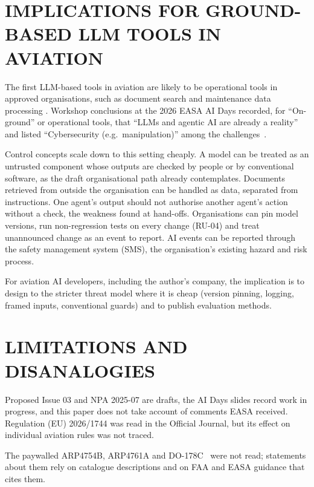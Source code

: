 \documentclass{aer}
\begin{document}
\section{IMPLICATIONS FOR GROUND-BASED LLM TOOLS IN AVIATION}\label{sec:ground}

The first LLM-based tools in aviation are likely to be operational tools in approved organisations, such as document search and maintenance data processing \citep[compare][slide~22]{easa2026aidays}. Workshop conclusions at the 2026 EASA AI Days recorded, for ``On-ground'' or operational tools, that ``LLMs and agentic AI are already a reality'' and listed ``Cybersecurity (e.g.~manipulation)'' among the challenges~\citep[slide~9]{easa2026aidays}.

Control concepts scale down to this setting cheaply. A model can be treated as an untrusted component whose outputs are checked by people or by conventional software, as the draft organisational path already contemplates. Documents retrieved from outside the organisation can be handled as data, separated from instructions. One agent's output should not authorise another agent's action without a check, the weakness \citet{remedios2026redteaming} found at hand-offs. Organisations can pin model versions, run non-regression tests on every change (RU-04) and treat unannounced change as an event to report. AI events can be reported through the safety management system (SMS), the organisation's existing hazard and risk process.

For aviation AI developers, including the author's company, the implication is to design to the stricter threat model where it is cheap (version pinning, logging, framed inputs, conventional guards) and to publish evaluation methods.

\section{LIMITATIONS AND DISANALOGIES}\label{sec:limitations}

Proposed Issue 03 and NPA 2025-07 are drafts, the AI Days slides record work in progress, and this paper does not take account of comments EASA received. Regulation (EU) 2026/1744 was read in the Official Journal, but its effect on individual aviation rules was not traced.

The paywalled ARP4754B, ARP4761A and DO-178C~\citep{sae2023arp4754b,sae2023arp4761a,rtca2011do178c} were not read; statements about them rely on catalogue descriptions and on FAA and EASA guidance that cites them.
\end{document}
